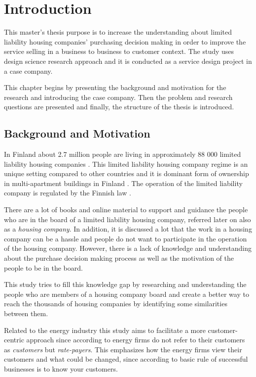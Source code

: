 \chapter{Introduction}
\label{chapter:intro}

This master's thesis purpose is to increase the understanding about limited liability housing companies' purchasing decision making in order to improve the service selling in a business to business to customer context. The study uses design science research approach and it is conducted as a service design project in a case company.

This chapter begins by presenting the background and motivation for the research and introducing the case company. Then the problem and research questions are presented and finally, the structure of the thesis is introduced.

\section{Background and Motivation}

In Finland about 2.7 million people are living in approximately 88 000 limited liability housing companies \parencite{REMF, Stats}. This limited liability housing company regime is an unique setting compared to other countries and it is dominant form of ownership in multi-apartment buildings in Finland \parencite{Lujanen:2017}. The operation of the limited liability company is regulated by the Finnish law \parencite{YIT}.

There are a lot of books and online material to support and guidance the people who are in the board of a limited liability housing company, referred later on also as a \emph{housing company}. In addition, it is discussed a lot that the work in a housing company can be a hassle and people do not want to participate in the operation of the housing company. However, there is a lack of knowledge and understanding about the purchase decision making process as well as the motivation of the people to be in the board.

This study tries to fill this knowledge gap by researching and understanding the people who are members of a housing company board and create a better way to reach the thousands of housing companies by identifying some similarities between them.

Related to the energy industry this study aims to facilitate a more customer-centric approach since according to \textcite{Fader:2012} energy firms do not refer to their customers as \emph{customers} but \emph{rate-payers}. This emphasizes how the energy firms view their customers and what could be changed, since according to \textcite{ByerPersonas:2015} basic rule of successful businesses is to know your customers.

